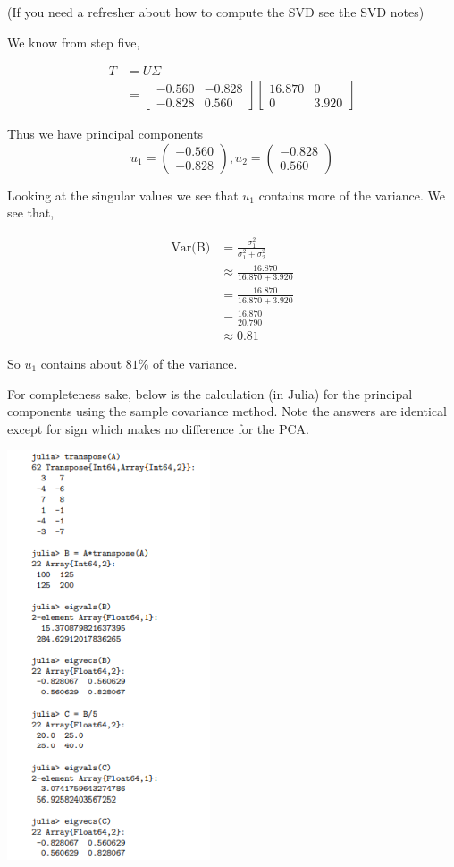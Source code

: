 \documentclass{article}
\begin{document}
(If you need a refresher about how to compute the SVD see the SVD notes)

We know from step five,

\begin{align}
T&=U\Sigma\\
&=\begin{bmatrix}
-0.560&-0.828\\
-0.828&0.560\end{bmatrix}
\begin{bmatrix}
16.870&0\\
0&3.920
\end{bmatrix}
\end{align}

Thus we have principal components
$$u_1=\begin{pmatrix}
-0.560\\
-0.828\end{pmatrix},u_2=\begin{pmatrix}
-0.828\\
0.560\end{pmatrix}$$

Looking at the singular values we see that $u_1$ contains more of the variance. We see that,

\begin{align}
\text{Var(B)}&=\frac{\sigma^2_1}{\sigma^2_1+\sigma^2_2}\\
&\approx\frac{16.870}{16.870+3.920}\\
&=\frac{16.870}{16.870+3.920}\\
&=\frac{16.870}{20.790}\\
&\approx 0.81
\end{align}

So $u_1$ contains about $81$\% of the variance.

For completeness sake, below is the calculation (in Julia) for the principal components using the sample covariance method. Note the answers are identical except for sign which makes no difference for the PCA.
\bigskip

\begin{center}
\includegraphics[width=6cm]{(19).png}
\end{center}
\end{document}
